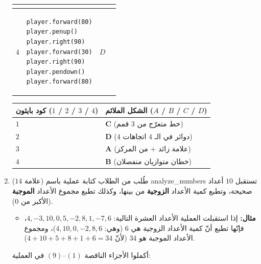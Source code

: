\documentclass[14pt]{extarticle}
\begin{document}
\begin{enumerate}[label=\textbf{السؤال \arabic*:}, wide=0pt, itemsep=2.2em]
{\begin{longtable}{|C{0.9cm}|p{7.2cm}|C{0.9cm}|C{5.2cm}|}
\begin{english}
\end{english}
\\ \hline
$4$ &
\begin{pycell}
\begin{english}
\begin{verbatim}
player.forward(80)
player.penup()
player.right(90)
player.forward(30)
player.right(90)
player.pendown()
player.forward(80)
\end{verbatim}
\end{english}
\end{pycell}
& $D$ &
\begin{english}
\vspace{0.1cm}
\end{english}
\\ \hline
\end{longtable}}

{\renewcommand{\arraystretch}{1.3}
\begin{longtable}{|C{4.5cm}|C{5.5cm}|}
\hline
\textbf{كود بايثون ($1$ / $2$ / $3$ / $4$)} & \textbf{الشكل الملائم ($A$ / $B$ / $C$ / $D$)} \\
\hline
$1$ & \ifwithsols $\mathbf{C}$ (خط متعرّج من $3$ قمم) \fi \\ \hline
$2$ & \ifwithsols $\mathbf{D}$ ($4$ دوائر في الـ $4$ اتجاهات) \fi \\ \hline
$3$ & \ifwithsols $\mathbf{A}$ (علامة زائد $+$ من المركز) \fi \\ \hline
$4$ & \ifwithsols $\mathbf{B}$ (خطان متوازيان منفصلان) \fi \\ \hline
\end{longtable}}
\filbreak

\item ($14$ علامة) طُلب من الطلاب كتابة عملية باسم \textenglish{analyze\_numbers} تستقبل $10$ أعداد صحيحة، وتطبع كمية الأعداد \textbf{الزوجية} من بينها، وكذلك تطبع مجموع الأعداد \textbf{الموجبة} (الأكبر من $0$).
\begin{itemize}
\item \textbf{مثال:} إذا استقبلت العملية الأعداد العشرة التالية: $4, -3, 10, 0, 5, -2, 8, 1, -7, 6$، فإنّها تطبع أنّ كمية الأعداد الزوجية هي $6$ (وهي: $4, 10, 0, -2, 8, 6$)، ومجموع الأعداد الموجبة هو $34$ (لأنّ $4 + 10 + 5 + 8 + 1 + 6 = 34$).
\end{itemize}
أكملوا الأجزاء الناقصة $(1)$–$(9)$ في العملية:


\end{enumerate}
\end{document}
